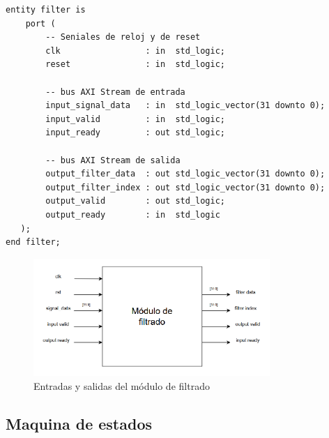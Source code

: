 \lstset{language=VHDL, breaklines=true, basicstyle=\footnotesize}
\begin{lstlisting}[frame=single]
    entity filter is
    port (
        -- Seniales de reloj y de reset
        clk                 : in  std_logic;
        reset               : in  std_logic; 
        
        -- bus AXI Stream de entrada
        input_signal_data   : in  std_logic_vector(31 downto 0);
        input_valid         : in  std_logic;
        input_ready         : out std_logic;
        
        -- bus AXI Stream de salida
        output_filter_data  : out std_logic_vector(31 downto 0);
        output_filter_index : out std_logic_vector(31 downto 0);
        output_valid        : out std_logic;
        output_ready        : in  std_logic   
   );
end filter;
\end{lstlisting}

\begin{figure}[h!]
    \centering
    \includegraphics[width=0.8\textwidth]{./Images/img_implementacion_hw/modfiltrado.png}
    \caption{Entradas y salidas del módulo de filtrado}
    \label{fig:modfiltrado}
\end{figure} 

\subsection{Maquina de estados}

